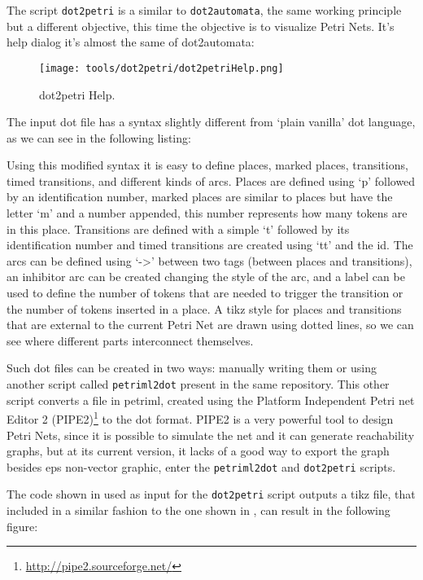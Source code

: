 The script \verb|dot2petri| is a similar to \verb|dot2automata|, the same
working principle but a different objective, this time the objective is to
visualize Petri Nets. It's help dialog it's almost the same of dot2automata:
\begin{figure}[H]
  \centering
  \texttt{[image: tools/dot2petri/dot2petriHelp.png]}
  \caption{dot2petri Help.}
  \label{fig:dot2petriHelp}
\end{figure}

The input dot file has a syntax slightly different from `plain vanilla' dot
language, as we can see in the following listing:



Using this modified syntax it is easy to define places, marked places,
transitions, timed transitions, and different kinds of arcs. Places are defined
using `p' followed by an identification number, marked places are similar to
places but have the letter `m' and a number appended, this number represents how
many tokens are in this place. Transitions are defined with a simple `t'
followed by its identification number and timed transitions are created using `tt' and the
id. The arcs can be defined using `->' between two tags (between places and
transitions), an inhibitor arc can be created changing the style of the arc, and
a label can be used to define the number of tokens that are needed to trigger
the transition or the number of tokens inserted in a place. A tikz style for places
and transitions that are external to the current Petri Net are drawn using
dotted lines, so we can see where different parts interconnect themselves.

Such dot files can be created in two ways: manually writing them or using
another script called \verb|petriml2dot| present in the same repository. This
other script converts a file in petriml, created using the Platform Independent Petri
net Editor 2 (PIPE2)\footnote{\url{http://pipe2.sourceforge.net/}} to the dot
format.
PIPE2 is a very powerful tool to design Petri Nets, since it is possible to simulate the
net and it can generate reachability graphs, but at its current version, it lacks of a
good way to export the graph besides eps non-vector graphic, enter the \verb|petriml2dot| and \verb|dot2petri| scripts.

The code shown in  used as input for the
\verb|dot2petri| script outputs a tikz file, that included in a similar fashion
to the one shown in , can result in the following figure:


